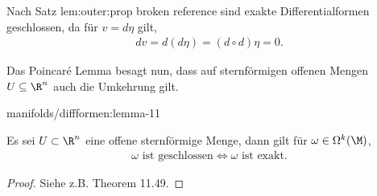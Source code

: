\documentclass[letterpaper,10pt,english]{jupyterBook}
\begin{document}

\par
Nach Satz {lem:outer:prop broken reference} sind exakte Differentialformen geschlossen, da für \(v=d\eta\) gilt,
\begin{align*}
dv = d(d\eta) = (d\circ d)\eta = 0.
\end{align*}
\par
Das Poincaré Lemma besagt nun, dass auf sternförmigen offenen Mengen \(U\subseteq \R^n\) auch die Umkehrung gilt.
\begin{lemma}{}{manifolds/diffformen:lemma-11}



\par
Es sei \(U\subset\R^n\) eine offene sternförmige Menge, dann gilt für \(\omega\in \Omega^k(\M)\),
\begin{align*}
\omega\text{ ist geschlossen}\Leftrightarrow \omega\text{ ist exakt.}
\end{align*}\end{lemma}

\begin{proof}
 Siehe z.B. \cite{Lee03} Theorem 11.49.
\end{proof}
\end{document}
